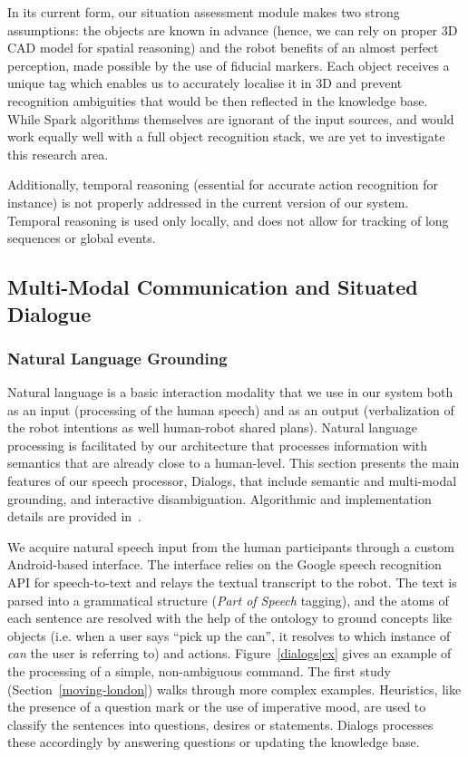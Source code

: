 \documentclass[preprint,3p,times]{elsarticle}
\newcommand{\ie}{i.e.\xspace}
\begin{document}
In its current form, our situation assessment module makes two strong
assumptions: the objects are known in advance (hence, we can rely on proper 3D
CAD model for spatial reasoning) and the robot benefits of an almost perfect
perception, made possible by the use of fiducial markers.  Each object receives
a unique tag which enables us to accurately localise it in 3D and prevent
recognition ambiguities that would be then reflected in the knowledge base.
While {\sc Spark} algorithms themselves are ignorant of the input sources, and
would work equally well with a full object recognition stack, we are yet to
investigate this research area.

Additionally, temporal reasoning (essential for accurate action recognition for
instance) is not properly addressed in the current version of our system. Temporal reasoning is used
only locally, and does not allow for tracking of long sequences or global events.


\subsection{Multi-Modal Communication and Situated Dialogue}
\label{sect|com}

\subsubsection{Natural Language Grounding}

Natural language is a basic interaction modality that we use in our system both
as an input (processing of the human speech) and as an output (verbalization of the
robot intentions as well human-robot shared plans). Natural language processing is facilitated by our architecture
that processes information with semantics that are already close to a
human-level. This section presents the main features of our speech processor,
{\sc Dialogs}, that include semantic and multi-modal grounding, and interactive
disambiguation. Algorithmic and implementation details are provided
in~\cite{Lemaignan2011a}.

We acquire natural speech input from the human participants through a custom
Android-based interface. The interface relies on the Google speech recognition API for
speech-to-text and relays the textual transcript to the robot. The text is parsed into
a grammatical structure (\emph{Part of Speech} tagging), and the atoms of each
sentence are resolved with the help of the ontology to ground concepts like
objects (\ie when a user says ``pick up the can'', it resolves to which instance of
\emph{can} the user is referring to) and actions.  Figure~\ref{dialogs|ex} gives
an example of the processing of a simple, non-ambiguous command. The first
study (Section~\ref{moving-london}) walks through more complex examples.
Heuristics, like the presence of a question mark or the use of imperative mood,
are used to classify the sentences into questions, desires or statements.
{\sc Dialogs} processes these accordingly by answering questions or
updating the knowledge base.
\end{document}
